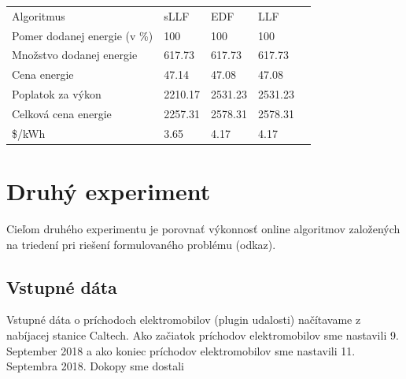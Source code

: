 
\begin{table}[H]
    \begin{tabular}{lllll}
    Algoritmus                    &  sLLF & EDF & LLF   & \\
    Pomer dodanej energie (v \%) & 100 & 100  & 100 &   \\
    Množstvo dodanej energie     & 617.73 &  617.73 & 617.73 &  \\
    Cena energie                &  47.14 & 47.08 &  47.08 &   \\
    Poplatok za výkon            & 2210.17 & 2531.23 & 2531.23  &  \\
    Celková cena energie         & 2257.31  & 2578.31 & 2578.31  &  \\
    \$/kWh                       & 3.65 & 4.17 & 4.17 &
    \end{tabular}
\end{table}

    






    

\section{Druhý experiment}
Cieľom druhého experimentu je porovnať výkonnosť online algoritmov založených na triedení pri riešení formulovaného problému (odkaz).

\subsection{Vstupné dáta}
Vstupné dáta o príchodoch elektromobilov (plugin udalosti) načítavame z nabíjacej stanice Caltech. Ako začiatok príchodov elektromobilov sme nastavili 9. September 2018 a ako koniec príchodov elektromobilov sme nastavili 11. Septembra 2018. Dokopy sme dostali 

